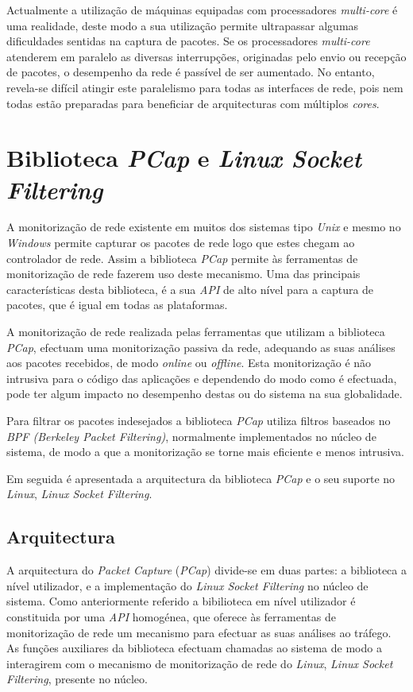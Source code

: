 Actualmente a utilização de máquinas equipadas com processadores \textit{multi-core} é uma realidade, deste modo a sua utilização permite ultrapassar algumas dificuldades sentidas na captura de pacotes.
Se os processadores \textit{multi-core} atenderem em paralelo as diversas interrupções, originadas pelo envio ou recepção de pacotes, o desempenho da rede é passível de ser aumentado.
No entanto, revela-se difícil atingir este paralelismo para todas as interfaces de rede, pois nem todas estão preparadas para beneficiar de arquitecturas com múltiplos \textit{cores}.

\section{Biblioteca \textit{PCap} e \textit{Linux Socket Filtering}}\label{sect:LibPcap}

A monitorização de rede existente em muitos dos sistemas tipo \textit{Unix} e mesmo no \textit{Windows} permite capturar os pacotes de rede logo que estes chegam ao controlador de rede.
Assim a biblioteca \textit{PCap}\cite{LibPcap} permite às ferramentas de monitorização de rede fazerem uso deste mecanismo.
Uma das principais características desta biblioteca, é a sua \textit{API} de alto nível para a captura de pacotes, que é igual em todas as plataformas.

A monitorização de rede realizada pelas ferramentas que utilizam a biblioteca \textit{PCap}, efectuam uma monitorização passiva da rede, adequando as suas análises aos pacotes recebidos, de modo \textit{online} ou \textit{offline}.
Esta monitorização é não intrusiva para o código das aplicações e dependendo do modo como é efectuada, pode ter algum impacto no desempenho destas ou do sistema na sua globalidade.

Para filtrar os pacotes indesejados a biblioteca \textit{PCap} utiliza filtros baseados no \textit{BPF (Berkeley Packet Filtering)}, normalmente implementados no núcleo de sistema, de modo a que a monitorização se torne mais eficiente e menos intrusiva.

Em seguida é apresentada a arquitectura da biblioteca \textit{PCap} e o seu suporte no \textit{Linux}, \textit{Linux Socket Filtering}.

\subsection {Arquitectura}
\label{sect:architecture_libpcap}
A arquitectura do \textit{Packet Capture} (\textit{PCap}) divide-se em duas partes: a biblioteca a nível utilizador, e a implementação do \textit{Linux Socket Filtering} no núcleo de sistema.
Como anteriormente referido a bibilioteca em nível utilizador é constituida por uma \textit{API} homogénea, que oferece às ferramentas de monitorização de rede um mecanismo para efectuar as suas análises ao tráfego.
As funções auxiliares da biblioteca efectuam chamadas ao sistema de modo a interagirem com o mecanismo de monitorização de rede do \textit{Linux}, \textit{Linux Socket Filtering}, presente no núcleo.

